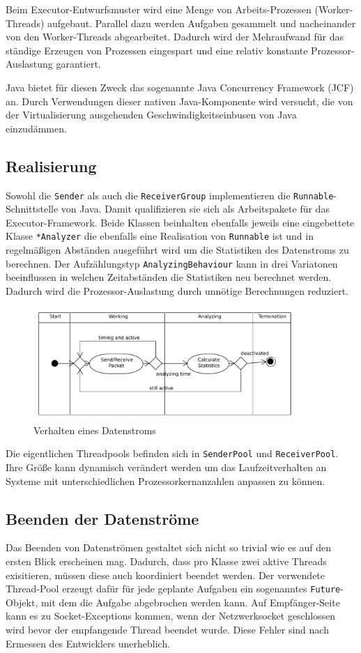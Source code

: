 Beim Executor-Entwurfsmuster wird eine Menge von Arbeits-Prozessen
(Worker-Threads) aufgebaut. Parallel dazu werden Aufgaben gesammelt und
nacheinander von den Worker-Threads abgearbeitet. Dadurch wird der Mehraufwand
für das ständige Erzeugen von Prozessen eingespart und eine relativ konstante
Prozessor-Auslastung garantiert.

Java bietet für diesen Zweck das sogenannte Java Concurrency Framework
(JCF) an. Durch Verwendungen dieser nativen Java-Komponente wird versucht, die
von der Virtualisierung ausgehenden Geschwindigkeitseinbusen von Java
einzudämmen.

\subsection{Realisierung}
Sowohl die \texttt{Sender} als auch die \texttt{ReceiverGroup} implementieren
die \texttt{Runnable}-Schnittstelle von Java. Damit qualifizieren sie sich als
Arbeitspakete für das Executor-Framework. Beide Klassen beinhalten ebenfalls jeweils eine
eingebettete Klasse \texttt{*Analyzer} die ebenfalls eine Realisation von
\texttt{Runnable} ist und in regelmäßigen Abständen ausgeführt wird um die
Statistiken des Datenstroms zu berechnen. Der
Aufzählungstyp \texttt{AnalyzingBehaviour} kann in drei Variatonen beeinflussen
in welchen Zeitabständen die Statistiken neu berechnet werden. Dadurch wird die
Prozessor-Auslastung durch unnötige Berechnungen reduziert.

\begin{figure}[H]
\center
\includegraphics[width=10cm]{images/datastream.pdf}
\caption{Verhalten eines Datenstroms}
\end{figure}

Die eigentlichen Threadpools befinden sich in \texttt{SenderPool} und
\texttt{ReceiverPool}. Ihre Größe kann dynamisch verändert werden um das
Laufzeitverhalten an Systeme mit unterschiedlichen Prozessorkernanzahlen
anpassen zu können.

\subsection{Beenden der Datenströme}
Das Beenden von Datenströmen gestaltet sich nicht so trivial wie es auf den
ersten Blick erscheinen mag. Dadurch, dass pro Klasse zwei aktive Threads
exisitieren, müssen diese auch koordiniert beendet werden. Der verwendete
Thread-Pool erzeugt dafür für jede geplante Aufgaben ein sogenanntes
\texttt{Future}-Objekt, mit dem die Aufgabe abgebrochen werden kann. Auf
Empfänger-Seite kann es zu Socket-Exceptions kommen, wenn der Netzwerksocket
geschlossen wird bevor der empfangende Thread beendet wurde. Diese Fehler sind
nach Ermessen des Entwicklers unerheblich.

